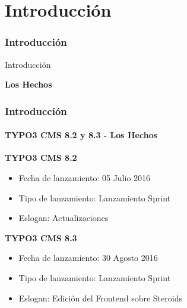 %

\section{Introducción}
\begin{frame}[fragile]
	\frametitle{Introducción}

	\begin{center}\huge{Introducción}\end{center}
	\begin{center}\huge{\color{typo3darkgrey}\textbf{Los Hechos}}\end{center}

\end{frame}

\begin{frame}[fragile]
	\frametitle{Introducción}
	\framesubtitle{TYPO3 CMS 8.2 y 8.3 - Los Hechos}

	\textbf{TYPO3 CMS 8.2}
	\begin{itemize}
		\item Fecha de lanzamiento: 05 Julio 2016
		\item Tipo de lanzamiento: Lanzamiento Sprint
		\item Eslogan: Actualizaciones
	\end{itemize}

	\vspace{0.6cm}

	\textbf{TYPO3 CMS 8.3}
	\begin{itemize}
		\item Fecha de lanzamiento: 30 Agosto 2016
		\item Tipo de lanzamiento: Lanzamiento Sprint
		\item Eslogan: Edición del Frontend sobre Steroids
	\end{itemize}


\end{frame}

